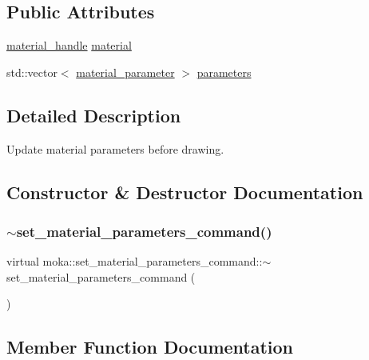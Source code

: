 \subsection*{Public Attributes}
\begin{DoxyCompactItemize}
\item 
\mbox{\hyperlink{structmoka_1_1material__handle}{material\+\_\+handle}} \mbox{\hyperlink{classmoka_1_1set__material__parameters__command_a1a5d8a86c457fc4d2c0033270bd3fa64}{material}}
\item 
std\+::vector$<$ \mbox{\hyperlink{structmoka_1_1material__parameter}{material\+\_\+parameter}} $>$ \mbox{\hyperlink{classmoka_1_1set__material__parameters__command_ae1ec908f405a367b43e799b62d749616}{parameters}}
\end{DoxyCompactItemize}


\subsection{Detailed Description}
Update material parameters before drawing. 

\subsection{Constructor \& Destructor Documentation}
\mbox{\label{classmoka_1_1set__material__parameters__command_a0b064dd9f44c8a9dbabe5e23edcf632c}} 
\subsubsection{\texorpdfstring{$\sim$set\_material\_parameters\_command()}{~set\_material\_parameters\_command()}}
{\footnotesize\ttfamily virtual moka\+::set\+\_\+material\+\_\+parameters\+\_\+command\+::$\sim$set\+\_\+material\+\_\+parameters\+\_\+command (\begin{DoxyParamCaption}{ }\end{DoxyParamCaption})\hspace{0.3cm}{\ttfamily [virtual]}}



\subsection{Member Function Documentation}
\mbox{\label{classmoka_1_1set__material__parameters__command_a00ba38678a50c8f1a80dfdc131a93ca7}} 
